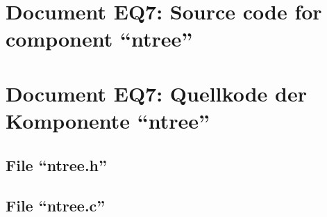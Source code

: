 \parindent0pt
\pagestyle{myheadings}
\ifenglish
{}
\fi
\ifgerman
{}
\fi

\ifenglish
\section*{Document EQ7: Source code for component ``ntree''}
\fi
\ifgerman
\section*{Document EQ7: Quellkode der Komponente "`ntree"'}
\fi

\subsection*{File ``ntree.h''}
\smallskip

\newpage

\subsection*{File ``ntree.c''}
\smallskip




